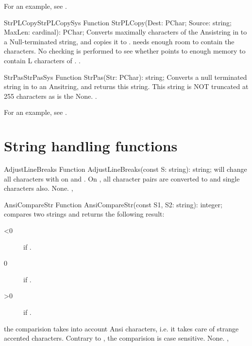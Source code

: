 For an example, see .

\begin{functionl}{StrPLCopy}{StrPLCopySys}
\Declaration
Function StrPLCopy(Dest: PChar; Source: string; MaxLen: cardinal): PChar;
\Description
{} Converts maximally  characters of the
Ansistring in  to a Null-terminated  string, and copies
it to .  needs enough room to contain
the  characters.
\Errors
No checking is performed to see whether  points to enough memory
to contain L characters of .
\Errors
\SeeAlso
{}.
\end{functionl}


\begin{functionl}{StrPas}{StrPasSys}
\Declaration
Function StrPas(Str: PChar): string;
\Description
Converts a null terminated string in  to an Ansitring, and returns
this string. This string is NOT truncated at 255 characters as is the
\Errors
None.
\SeeAlso
{}.
\end{functionl}

For an example, see .

\section{String handling functions}

\begin{function}{AdjustLineBreaks}
\Declaration
Function AdjustLineBreaks(const S: string): string;
\Description
{} will change all  characters with
 on \windowsnt and \dos. On \linux, all 
character pairs are converted to  and single 
characters also.
\Errors
None.
\SeeAlso
{}, 
\end{function}



\begin{function}{AnsiCompareStr}
\Declaration
Function AnsiCompareStr(const S1, S2: string): integer;
\Description
{} compares two strings and returns the following
result:
\begin{description}
\item[<0]  if .
\item[0]  if .
\item[>0] if .
\end{description}
the comparision takes into account Ansi characters, i.e. it takes
care of strange accented characters. Contrary to ,
the comparision is case sensitive.
\Errors
None.
\SeeAlso
{}, 
\end{function}

